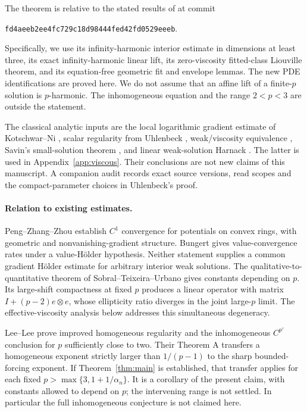 \documentclass[11pt]{article}
\theoremstyle{remark}\newtheorem{remark}[theorem]{Remark}
\begin{document}
The theorem is relative to the stated results of \cite{OpenAI} at commit
\begin{center}\texttt{fd4aeeb2ee4fc729c18d98444fed42fd0529eeeb}.\end{center}
Specifically,
we use its infinity-harmonic interior estimate in dimensions at least
three, its exact infinity-harmonic linear lift, its zero-viscosity
fitted-class Liouville theorem, and its equation-free geometric fit
and envelope lemmas. The new PDE identifications are proved here.
We do not assume that an affine lift of a finite-$p$ solution is
$p$-harmonic. The inhomogeneous equation and the range $2<p<3$ are
outside the statement.

The classical analytic inputs are the local logarithmic gradient
estimate of Kotschwar--Ni \cite{KotschwarNi}, scalar regularity from
Uhlenbeck \cite{Uhlenbeck}, weak/viscosity equivalence
\cite{JulinJuutinen}, Savin's small-solution theorem \cite{Savin}, and
linear weak-solution Harnack \cite{Crescimbeni}. The latter is used
in Appendix~\ref{app:viscous}. Their conclusions are not new claims
of this manuscript. A companion audit records exact source versions,
read scopes and the compact-parameter choices in Uhlenbeck's proof.

\paragraph{Relation to existing estimates.}
Peng--Zhang--Zhou \cite[Theorem 1.1]{PengZhangZhou} establish
$C^1$ convergence for potentials on convex rings, with geometric
and nonvanishing-gradient structure. Bungert \cite[Theorem 1]{Bungert}
gives value-convergence rates under a value-Hölder hypothesis.
Neither statement supplies a common gradient Hölder estimate for
arbitrary interior weak solutions. The qualitative-to-quantitative
theorem of Sobral--Teixeira--Urbano
\cite[Theorem 1.1]{SobralTeixeiraUrbano} gives constants depending on
$p$. Its large-shift compactness at fixed $p$ produces a linear
operator with matrix $I+(p-2)e\otimes e$, whose ellipticity ratio
diverges in the joint large-$p$ limit. The effective-viscosity
analysis below addresses this simultaneous degeneracy.

Lee--Lee \cite{LeeLee} prove improved homogeneous regularity and the
inhomogeneous $C^{p'}$ conclusion for $p$ sufficiently close to two.
Their Theorem A transfers a homogeneous exponent strictly larger than
$1/(p-1)$ to the sharp bounded-forcing exponent. If
Theorem~\ref{thm:main} is established, that transfer applies for each
fixed $p>\max\{3,1+1/\alpha_n\}$. It is a corollary of the present
claim, with constants allowed to depend on $p$; the intervening range
is not settled. In particular the full inhomogeneous conjecture is
not claimed here.
\end{document}
